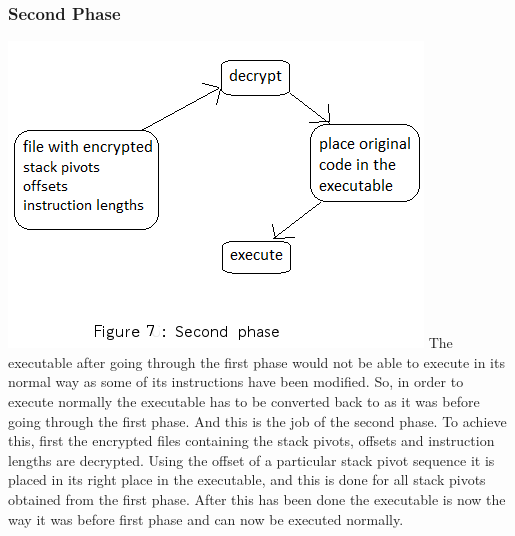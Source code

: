 \documentclass{article}
\begin{document}
\begin{multicols}{2}
	\subsubsection{Second Phase}
	\includegraphics[scale=.5]{phase2.png}\break
	The executable after going through the first phase would not be able to execute in its normal way as some of its instructions have been modified. So, in order to execute normally the executable has to be converted back to as it was before going through the first phase. And this is the job of the second phase. To achieve this, first the encrypted files containing the stack pivots, offsets and instruction lengths are decrypted. Using the offset of a particular stack pivot sequence it is placed in its right place in the executable, and this is done for all stack pivots obtained from the first phase. After this has been done the executable is now the way it was before first phase and can now be executed normally.
	

\end{multicols}
\end{document}
